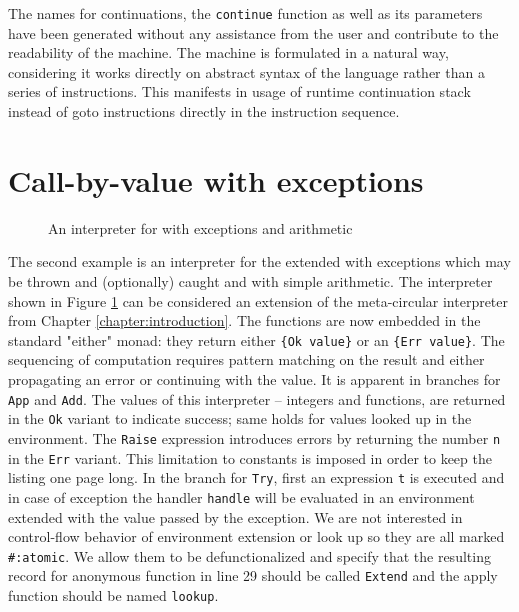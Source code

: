 The names for continuations, the \lstinline!continue! function as well as its parameters have been generated without any assistance from the user and contribute to the readability of the machine.
The machine is formulated in a natural way, considering it works directly on abstract syntax of the language rather than a series of instructions.
This manifests in usage of runtime continuation stack instead of goto instructions directly in the instruction sequence.

\section{Call-by-value \LC{} with exceptions}
\begin{figure}
  
  \caption{An interpreter for \LC{} with exceptions and arithmetic}
  \label{fig:studies-exceptions}
\end{figure}

The second example is an interpreter for the \LC{} extended with exceptions which may be thrown and (optionally) caught and with simple arithmetic.
The interpreter shown in Figure \ref{fig:studies-exceptions} can be considered an extension of the meta-circular interpreter from Chapter \ref{chapter:introduction}.
The functions are now embedded in the standard "either" monad: they return either \lstinline!{Ok value}! or an \lstinline!{Err value}!.
The sequencing of computation requires pattern matching on the result and either propagating an error or continuing with the value.
It is apparent in branches for \lstinline!App! and \lstinline!Add!.
The values of this interpreter -- integers and functions, are returned in the \lstinline!Ok! variant to indicate success; same holds for values looked up in the environment.
The \lstinline!Raise! expression introduces errors by returning the number \lstinline!n! in the \lstinline!Err! variant.
This limitation to constants is imposed in order to keep the listing one page long.
In the branch for \lstinline!Try!, first an expression \lstinline!t! is executed and in case of exception the handler \lstinline!handle! will be evaluated in an environment extended with the value passed by the exception.
We are not interested in control-flow behavior of environment extension or look up so they are all marked \lstinline!#:atomic!.
We allow them to be defunctionalized and specify that the resulting record for anonymous function in line 29 should be called \lstinline!Extend! and the apply function should be named \lstinline!lookup!.


